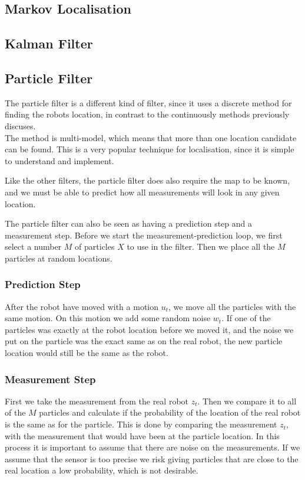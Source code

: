 \subsection{Markov Localisation}

\subsection{Kalman Filter}

\subsection{Particle Filter}
The particle filter is a different kind of filter, since it uses a discrete method for finding the robots location, in contrast to the continuously methods previously discuses. \\
The method is multi-model, which means that more than one location candidate can be found. This is a very popular technique for localisation, since it is simple to understand and implement. 

Like the other filters, the particle filter does also require the map to be known, and we must be able to predict how all measurements will look in any given location. 

The particle filter can also be seen as having a prediction step and a measurement step. Before we start the measurement-prediction loop, we first select a number $M$ of particles $X$ to use in the filter. Then we place all the $M$ particles at random locations. 

\subsubsection{Prediction Step}
After the robot have moved with a motion $u_t$, we move all the particles with the same motion. On this motion we add some random noise $w_t$. If one of the particles was exactly at the robot location before we moved it, and the noise we put on the particle was the exact same as on the real robot, the new particle location would still be the same as the robot.  

\subsubsection{Measurement Step}
First we take the measurement from the real robot $z_t$. Then we compare it to all of the $M$ particles and calculate if the probability of the location of the real robot is the same as for the particle. This is done by comparing the measurement $z_t$, with the measurement that would have been at the particle location.
In this process it is important to assume that there are noise on the measurements. If we assume that the sensor is too precise we risk giving particles that are close to the real location a low probability, which is not desirable.

